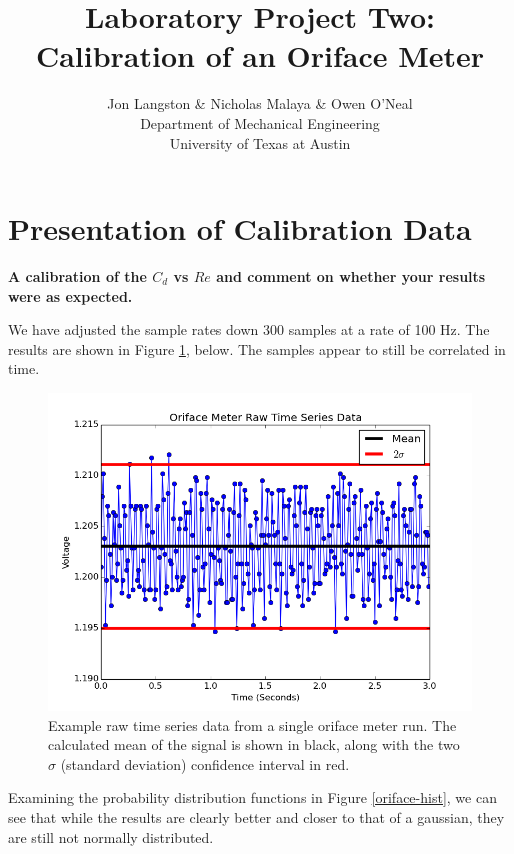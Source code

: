 \documentclass{article}
\title{\bf{Laboratory Project Two: Calibration of an Oriface Meter}}
\author{Jon Langston \& Nicholas Malaya \& Owen O'Neal \\ Department of Mechanical Engineering \\ University of Texas at Austin} \date{}
\begin{document}
\maketitle
\date{}
\newpage
\section{Presentation of Calibration Data}

\textbf{A calibration of the $C_d$ vs $Re$ and comment on whether your
results were as expected.}   

We have adjusted the sample rates down  300 samples at a rate of 100
Hz. The results are shown in Figure 
\ref{oriface-time}, below. The samples appear to still be correlated in
time. 

\begin{figure}[!htb]
  \begin{center}
    \includegraphics[width = 12 cm]{figs/oriface_time.png}
    \caption{Example raw time series data from a single oriface meter 
      run. The calculated mean of the signal is shown in black, along with
      the two $\sigma$ (standard deviation) confidence interval in
      red.}
    \label{oriface-time}
  \end{center}
\end{figure}

Examining the probability distribution functions in Figure \ref{oriface-hist},
we can see that while the results are clearly better and closer to that
of a gaussian, they are still not normally distributed. 
\end{document}
